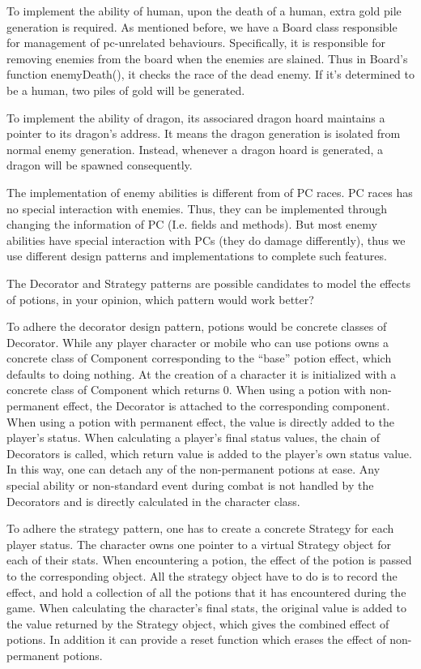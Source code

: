 \documentclass[11pt]{article}
\theoremstyle{plain} \newtheorem{theorem*}{Theorem}[subsection]
\begin{document}
To implement the ability of human, upon the death of a human, extra gold pile
generation is required. As mentioned before, we have a Board class responsible
for management of pc-unrelated behaviours. Specifically, it is responsible for
removing enemies from the board when the enemies are slained. Thus in Board’s
function enemyDeath(), it checks the race of the dead enemy. If it’s determined
to be a human, two piles of gold will be generated. 

To implement the ability of dragon, its associared dragon hoard maintains a
pointer to its dragon’s address. It means the dragon generation is isolated
from normal enemy generation. Instead, whenever a dragon hoard is generated, a
dragon will be spawned consequently.  

The implementation of enemy abilities is different from of PC races. PC races
has no special interaction with enemies. Thus, they can be implemented through
changing the information of PC (I.e. fields and methods). But most enemy
abilities have special interaction with PCs (they do damage differently), thus
we use different design patterns and implementations to complete such features. 

The Decorator and Strategy patterns are possible candidates to model the
effects of potions, in your opinion, which pattern would work better? 

To adhere the decorator design pattern, potions would be concrete classes of
Decorator. While any player character or mobile who can use potions owns a
concrete class of Component corresponding to the “base” potion effect, which
defaults to doing nothing. At the creation of a character it is initialized
with a concrete class of Component which returns 0. When using a potion with
non-permanent effect, the Decorator is attached to the corresponding component.
When using a potion with permanent effect, the value is directly added to the
player’s status. When calculating a player’s final status values, the chain of
Decorators is called, which return value is added to the player’s own status
value. In this way, one can detach any of the non-permanent potions at ease.
Any special ability or non-standard event during combat is not handled by the
Decorators and is directly calculated in the character class. 

To adhere the strategy pattern, one has to create a concrete Strategy for each
player status. The character owns one pointer to a virtual Strategy object for
each of their stats. When encountering a potion, the effect of the potion is
passed to the corresponding object. All the strategy object have to do is to
record the effect, and hold a collection of all the potions that it has
encountered during the game. When calculating the character’s final stats, the
original value is added to the value returned by the Strategy object, which
gives the combined effect of potions. In addition it can provide a reset
function which erases the effect of non-permanent potions.  
\end{document}
